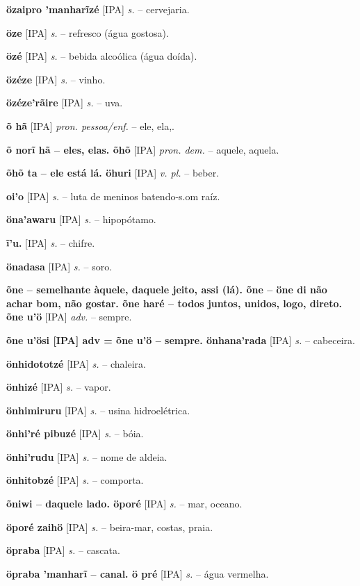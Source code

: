\textbf{özaipro 'manharĩzé} [IPA] \textit{s.} -- cervejaria.

\textbf{öze} [IPA] \textit{s.} -- refresco (água gostosa).

\textbf{özé} [IPA] \textit{s.} -- bebida alcoólica (água doída).

\textbf{özéze} [IPA] \textit{s.} -- vinho.

\textbf{özéze'rãire} [IPA] \textit{s.} -- uva.

\textbf{õ hã} [IPA] \textit{pron. pessoa/enf.} -- ele, ela,.

\textbf{õ norĩ hã -- eles, elas. õhõ} [IPA] \textit{pron. dem.} -- aquele, aquela.

\textbf{õhõ ta -- ele está lá. öhuri} [IPA] \textit{v. pl.} -- beber.

\textbf{oi'o} [IPA] \textit{s.} -- luta de meninos batendo-s.om raíz.

\textbf{öna'awaru} [IPA] \textit{s.} -- hipopótamo.

\textbf{ĩ'u.} [IPA] \textit{s.} -- chifre. \href{https://xavante.pythonanywhere.com/static/dicionario/play.html?file=horn.wav}{\faHeadphones}

\textbf{önadasa} [IPA] \textit{s.} -- soro.

\textbf{õne -- semelhante àquele, daquele jeito, assi (lá). õne -- öne di não achar bom, não gostar. õne haré -- todos juntos, unidos, logo, direto. õne u'ö} [IPA] \textit{adv.} -- sempre.

\textbf{õne u'ösi [IPA] adv = õne u'ö -- sempre. önhana'rada} [IPA] \textit{s.} -- cabeceira.

\textbf{önhidototzé} [IPA] \textit{s.} -- chaleira.

\textbf{önhizé} [IPA] \textit{s.} -- vapor.

\textbf{önhimiruru} [IPA] \textit{s.} -- usina hidroelétrica.

\textbf{önhi'ré pibuzé} [IPA] \textit{s.} -- bóia.

\textbf{önhi'rudu} [IPA] \textit{s.} -- nome de aldeia.

\textbf{önhitobzé} [IPA] \textit{s.} -- comporta.

\textbf{õniwi -- daquele lado. öporé} [IPA] \textit{s.} -- mar, oceano.

\textbf{öporé zaihö} [IPA] \textit{s.} -- beira-mar, costas, praia.

\textbf{öpraba} [IPA] \textit{s.} -- cascata.

\textbf{öpraba 'manharĩ -- canal. ö pré} [IPA] \textit{s.} -- água vermelha.

